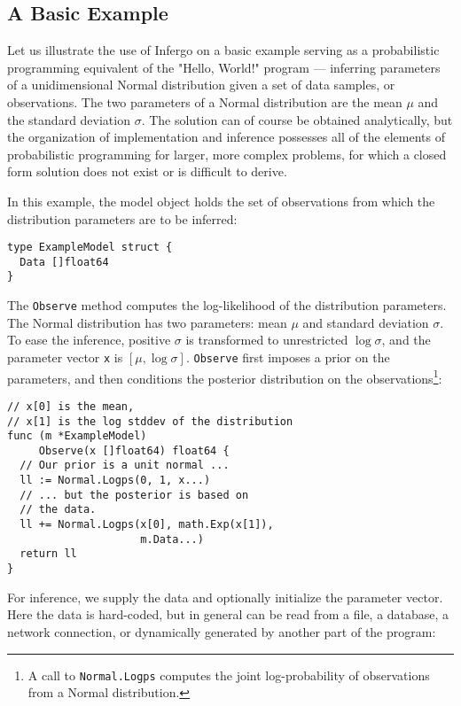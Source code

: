 \documentclass[sigplan,10pt,screen]{acmart}
\begin{document}
\begin{sloppypar}
\subsection{A Basic Example}
\label{sec:basic-example}

Let us illustrate the use of Infergo on a basic example serving
as a probabilistic programming equivalent of the "Hello, World!"
program --- inferring parameters of a unidimensional Normal
distribution given a set of data samples, or observations. The
two parameters of a Normal distribution are the mean $\mu$ and
the standard deviation $\sigma$. The solution can of course be
obtained analytically, but the organization of implementation
and inference possesses all of the elements of probabilistic
programming for larger, more complex problems, for which a
closed form solution does not exist or is difficult to derive.

In this example, the model object holds the set of observations
from which the distribution parameters are to be inferred:
\begin{lstlisting}
type ExampleModel struct {
  Data []float64
}
\end{lstlisting}

The \lstinline{Observe} method computes the log-likelihood of
the distribution parameters. The Normal distribution has two
parameters: mean $\mu$ and standard deviation $\sigma$. To ease
the inference, positive $\sigma$ is transformed to unrestricted
$\log \sigma$, and the parameter vector \lstinline{x} is $[\mu,
\log \sigma]$. \lstinline{Observe} first imposes a prior on the
parameters, and then conditions the posterior distribution on
the observations\footnote{A call to \lstinline{Normal.Logps}
computes the joint log-probability of observations from a Normal
distribution.}:

\begin{lstlisting}
// x[0] is the mean,
// x[1] is the log stddev of the distribution
func (m *ExampleModel)
     Observe(x []float64) float64 {
  // Our prior is a unit normal ...
  ll := Normal.Logps(0, 1, x...)
  // ... but the posterior is based on 
  // the data.
  ll += Normal.Logps(x[0], math.Exp(x[1]),
                     m.Data...)
  return ll
}
\end{lstlisting}

For inference, we supply the data and optionally initialize the
parameter vector. Here the data is hard-coded, but in general
can be read from a file, a database, a network connection,
or dynamically generated by another part of the program:


\end{sloppypar}
\end{document}
